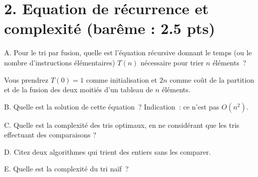 \documentclass[11pt]{article}
\begin{document}
{
\section*{2. Equation de récurrence et complexité (barême : 2.5 pts)}
A. Pour le tri par fusion, quelle est l'équation récursive
donnant le temps  (ou  le nombre d'instructions élémentaires) $T(n)$ nécessaire pour trier $n$ éléments~? 


Vous prendrez $T(0)=1$ comme initialisation et $2n$ comme coût de la partition et de la  fusion des deux moitiés d'un tableau de $n$ éléments. 

\medskip
B. Quelle est la solution de cette équation~? Indication~: ce n'est pas $O( n^2)$.

\medskip
C. Quelle est la complexité des tris optimaux, en ne considérant que les tris effectuant des comparaisons ?

\medskip
D. Citez deux algorithmes qui trient des entiers sans les comparer.

\medskip
E. Quelle est la complexité du tri naïf~?
}
\end{document}
